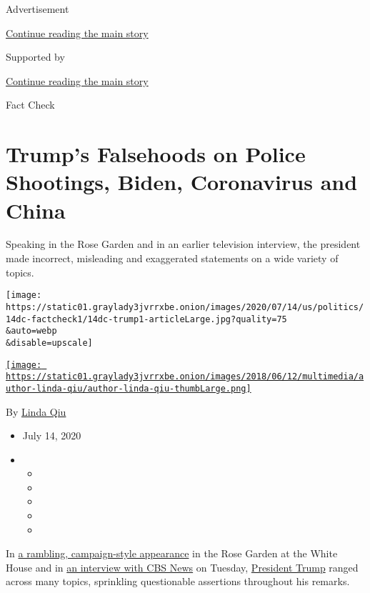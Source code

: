 Advertisement

\protect\hyperlink{after-top}{Continue reading the main story}

Supported by

\protect\hyperlink{after-sponsor}{Continue reading the main story}

Fact Check

\hypertarget{trumps-falsehoods-on-police-shootings-biden-coronavirus-and-china}{%
\section{Trump's Falsehoods on Police Shootings, Biden, Coronavirus and
China}\label{trumps-falsehoods-on-police-shootings-biden-coronavirus-and-china}}

Speaking in the Rose Garden and in an earlier television interview, the
president made incorrect, misleading and exaggerated statements on a
wide variety of topics.

\texttt{[image: https://static01.graylady3jvrrxbe.onion/images/2020/07/14/us/politics/14dc-factcheck1/14dc-trump1-articleLarge.jpg?quality=75\\\&auto=webp\\\&disable=upscale]}

\href{https://www.nytimes3xbfgragh.onion/by/linda-qiu}{\texttt{[image: https://static01.graylady3jvrrxbe.onion/images/2018/06/12/multimedia/author-linda-qiu/author-linda-qiu-thumbLarge.png]}}

By \href{https://www.nytimes3xbfgragh.onion/by/linda-qiu}{Linda Qiu}

\begin{itemize}
\item
  July 14, 2020
\item
  \begin{itemize}
  \item
  \item
  \item
  \item
  \item
  \end{itemize}
\end{itemize}

In
\href{https://www.nytimes3xbfgragh.onion/2020/07/14/us/politics/trump-news-conference.html}{a
rambling, campaign-style appearance} in the Rose Garden at the White
House and in
\href{https://www.cbsnews.com/news/trump-black-americans-killed-police-white-too/}{an
interview with CBS News} on Tuesday,
\href{https://www.nytimes3xbfgragh.onion/2020/08/10/us/trump-white-house-shooting.html}{President
Trump} ranged across many topics, sprinkling questionable assertions
throughout his remarks.

